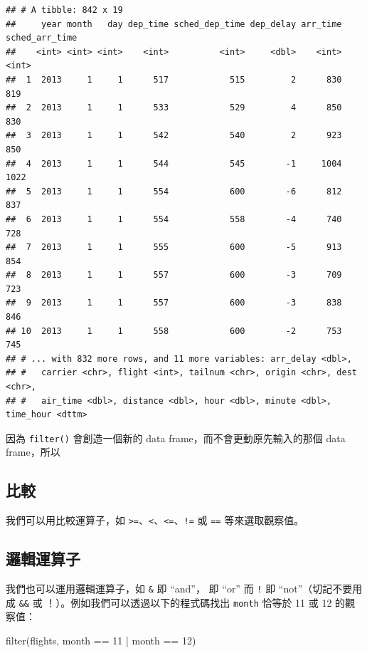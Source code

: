 \documentclass[
]{book}
\newenvironment{Shaded}{\begin{snugshade}}{\end{snugshade}}
\newcommand{\DecValTok}[1]{\textcolor[rgb]{0.00,0.00,0.81}{#1}}
\newcommand{\FunctionTok}[1]{\textcolor[rgb]{0.00,0.00,0.00}{#1}}
\newcommand{\NormalTok}[1]{#1}
\newcommand{\SpecialCharTok}[1]{\textcolor[rgb]{0.00,0.00,0.00}{#1}}
\theoremstyle{definition}
\theoremstyle{remark}
\begin{document}
\begin{verbatim}
## # A tibble: 842 x 19
##     year month   day dep_time sched_dep_time dep_delay arr_time sched_arr_time
##    <int> <int> <int>    <int>          <int>     <dbl>    <int>          <int>
##  1  2013     1     1      517            515         2      830            819
##  2  2013     1     1      533            529         4      850            830
##  3  2013     1     1      542            540         2      923            850
##  4  2013     1     1      544            545        -1     1004           1022
##  5  2013     1     1      554            600        -6      812            837
##  6  2013     1     1      554            558        -4      740            728
##  7  2013     1     1      555            600        -5      913            854
##  8  2013     1     1      557            600        -3      709            723
##  9  2013     1     1      557            600        -3      838            846
## 10  2013     1     1      558            600        -2      753            745
## # ... with 832 more rows, and 11 more variables: arr_delay <dbl>,
## #   carrier <chr>, flight <int>, tailnum <chr>, origin <chr>, dest <chr>,
## #   air_time <dbl>, distance <dbl>, hour <dbl>, minute <dbl>, time_hour <dttm>
\end{verbatim}

因為 \texttt{filter()} 會創造一個新的 data frame，而不會更動原先輸入的那個 data frame，所以

\hypertarget{ux6bd4ux8f03}{%
\subsection{比較}\label{ux6bd4ux8f03}}

我們可以用比較運算子，如 \texttt{\textgreater{}=}、\texttt{\textless{}}、\texttt{\textless{}=}、\texttt{!=} 或 \texttt{==} 等來選取觀察值。

\hypertarget{ux908fux8f2fux904bux7b97ux5b50}{%
\subsection{邏輯運算子}\label{ux908fux8f2fux904bux7b97ux5b50}}

我們也可以運用邏輯運算子，如 \texttt{\&} 即 ``and''，\texttt{\textbar{}} 即 ``or'' 而 \texttt{!} 即 ``not''（切記不要用成 \texttt{\&\&} 或 \texttt{\textbar{}\textbar{}}！）。例如我們可以透過以下的程式碼找出 \texttt{month} 恰等於 11 或 12 的觀察值：

\begin{Shaded}
\begin{Highlighting}[]
\FunctionTok{filter}\NormalTok{(flights, month }\SpecialCharTok{==} \DecValTok{11} \SpecialCharTok{|}\NormalTok{ month }\SpecialCharTok{==} \DecValTok{12}\NormalTok{)}
\end{Highlighting}
\end{Shaded}
\end{document}
